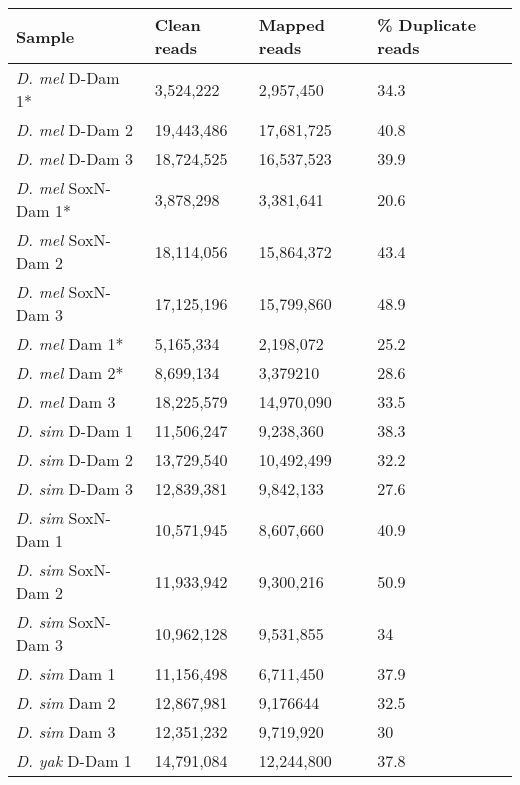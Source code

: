 \begin{table}[!h]
\centering
\begin{tabular}{|l|l|l|l|}
\hline
\textbf{Sample}             & \textbf{Clean reads} & \textbf{Mapped reads} & \textbf{\% Duplicate reads} \\ \hline
\emph{D. mel} D-Dam 1*    & 3,524,222   & 2,957,450    & 34.3               \\ \hline 
\emph{D. mel} D-Dam 2     & 19,443,486  & 17,681,725   & 40.8               \\ \hline
\emph{D. mel} D-Dam 3     & 18,724,525  & 16,537,523   & 39.9               \\ \hline
\emph{D. mel} SoxN-Dam 1* & 3,878,298   & 3,381,641    & 20.6               \\ \hline
\emph{D. mel} SoxN-Dam 2  & 18,114,056  & 15,864,372   & 43.4               \\ \hline
\emph{D. mel} SoxN-Dam 3  & 17,125,196  & 15,799,860   & 48.9               \\ \hline
\emph{D. mel} Dam 1*      & 5,165,334   & 2,198,072    & 25.2               \\ \hline
\emph{D. mel} Dam 2*      & 8,699,134   & 3,379210     & 28.6               \\ \hline
\emph{D. mel} Dam 3       & 18,225,579  & 14,970,090   & 33.5               \\ \hline
\emph{D. sim} D-Dam 1     & 11,506,247  & 9,238,360    & 38.3               \\ \hline
\emph{D. sim} D-Dam 2     & 13,729,540  & 10,492,499   & 32.2               \\ \hline
\emph{D. sim} D-Dam 3     & 12,839,381  & 9,842,133    & 27.6               \\ \hline
\emph{D. sim} SoxN-Dam 1  & 10,571,945  & 8,607,660    & 40.9               \\ \hline
\emph{D. sim} SoxN-Dam 2  & 11,933,942  & 9,300,216    & 50.9               \\ \hline
\emph{D. sim} SoxN-Dam 3  & 10,962,128  & 9,531,855    & 34                 \\ \hline
\emph{D. sim} Dam 1       & 11,156,498  & 6,711,450    & 37.9               \\ \hline
\emph{D. sim} Dam 2       & 12,867,981  & 9,176644     & 32.5               \\ \hline
\emph{D. sim} Dam 3       & 12,351,232  & 9,719,920    & 30                 \\ \hline
\emph{D. yak} D-Dam 1     & 14,791,084  & 12,244,800   & 37.8               \\ \hline

\end{tabular}
\end{table}
